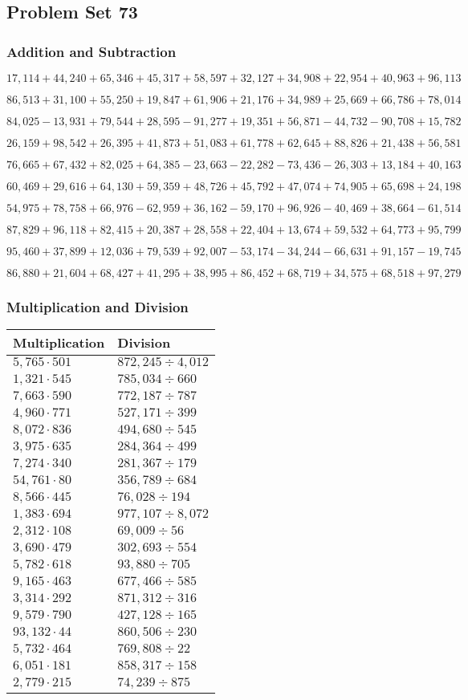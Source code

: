 \hypertarget{problem-set-73}{%
\subsection{Problem Set 73}\label{problem-set-73}}

\hypertarget{addition-and-subtraction-295}{%
\subsubsection{Addition and
Subtraction}\label{addition-and-subtraction-295}}

\(17,114+44,240+65,346+45,317+58,597+32,127+34,908+22,954+40,963+ 96,113\)

\(86,513+31,100+55,250+19,847+61,906+21,176+34,989+25,669+66,786+78,014\)

\(84,025-13,931+79,544+28,595-91,277+19,351+56,871-44,732-90,708+15,782\)

\(26,159+98,542+26,395+41,873+51,083+61,778+62,645+88,826+21,438+56,581\)

\(76,665+67,432+82,025+64,385-23,663-22,282-73,436-26,303+13,184+40,163\)

\(60,469+29,616+64,130+59,359+48,726+45,792+47,074+74,905+65,698+24,198\)

\(54,975+78,758+66,976-62,959+36,162-59,170+96,926-40,469+38,664-61,514\)

\(87,829+96,118+82,415+20,387+28,558+22,404+13,674+59,532+64,773+95,799\)

\(95,460+37,899+12,036+79,539+92,007-53,174-34,244-66,631+91,157-19,745\)

\(86,880+21,604+68,427+41,295+38,995+86,452+68,719+34,575+68,518+97,279\)

\hypertarget{multiplication-and-division-294}{%
\subsubsection{Multiplication and
Division}\label{multiplication-and-division-294}}

\begin{longtable}[]{@{}ll@{}}
\toprule
Multiplication & Division\tabularnewline
\midrule
\endhead
\(5,765\cdot501\) & \(872,245÷4,012\)\tabularnewline
\(1,321\cdot545\) & \(785,034÷660\)\tabularnewline
\(7,663\cdot590\) & \(772,187÷787\)\tabularnewline
\(4,960\cdot771\) & \(527,171÷399\)\tabularnewline
\(8,072\cdot836\) & \(494,680÷545\)\tabularnewline
\(3,975\cdot635\) & \(284,364÷499\)\tabularnewline
\(7,274\cdot340\) & \(281,367÷179\)\tabularnewline
\(54,761\cdot80\) & \(356,789÷684\)\tabularnewline
\(8,566\cdot445\) & \(76,028÷194\)\tabularnewline
\(1,383\cdot694\) & \(977,107÷8,072\)\tabularnewline
\(2,312\cdot108\) & \(69,009÷56\)\tabularnewline
\(3,690\cdot479\) & \(302,693÷554\)\tabularnewline
\(5,782\cdot618\) & \(93,880÷705\)\tabularnewline
\(9,165\cdot463\) & \(677,466÷585\)\tabularnewline
\(3,314\cdot292\) & \(871,312÷316\)\tabularnewline
\(9,579\cdot790\) & \(427,128÷165\)\tabularnewline
\(93,132\cdot44\) & \(860,506÷230\)\tabularnewline
\(5,732\cdot464\) & \(769,808÷22\)\tabularnewline
\(6,051\cdot181\) & \(858,317÷158\)\tabularnewline
\(2,779\cdot215\) & \(74,239÷875\)\tabularnewline
\bottomrule
\end{longtable}

